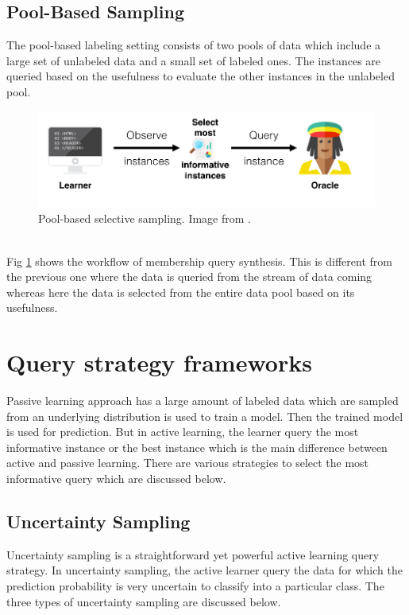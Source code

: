 \subsection{Pool-Based Sampling}
The pool-based labeling setting consists of two pools of data which include a large set of unlabeled data and a small set of labeled ones. The instances are queried based on the usefulness to evaluate the other instances in the unlabeled pool.
\begin{figure}[h!]
	\centering
	\includegraphics[scale=0.4]{images/pool_based}
	\caption{Pool-based selective sampling. Image from \cite{active_learning_datacamp}.}
	\label{pool_based}
\end{figure}\\

Fig \ref{pool_based} shows the workflow of membership query synthesis. This is different from the previous one where the data is queried from the stream of data coming whereas here the data is selected from the entire data pool based on its usefulness. \cite{Settles2010}\cite{active_learning_datacamp}
\section{Query strategy frameworks}
Passive learning approach has a large amount of labeled data which are sampled from an underlying distribution is used to train a model. Then the trained model is used for prediction. But in active learning, the learner query the most informative instance or the best instance which is the main difference between active and passive learning. There are various strategies to select the most informative query which are discussed below. \cite{Settles2010}

\subsection{Uncertainty Sampling}

Uncertainty sampling is a straightforward yet powerful active learning query strategy. In uncertainty sampling, the active learner query the data for which the prediction probability is very uncertain to classify into a  particular class. The three types of uncertainty sampling are discussed below.
   
